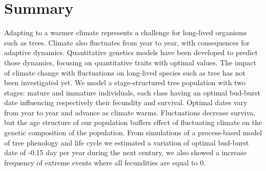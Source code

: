 \section*{Summary}

Adapting to a warmer climate represents a challenge for long-lived organisms such as trees. Climate also fluctuates from year to year, with consequences for adaptive dynamics. Quantitative genetics models have been developed to predict those dynamics, focusing on quantitative traits with optimal values. The impact of climate change with fluctuations on long-lived species such as tree has not been investigated yet.
We model a stage-structured tree population with two stages: mature and immature individuals, each class having an optimal bud-burst date influencing respectively their fecundity and survival. Optimal dates vary from year to year and advance as climate warms.
Fluctuations decrease surviva, but the age structure of our population buffers effect of fluctuating climate on the genetic composition of the population. From simulations of a process-based model of tree phenology and life cycle we estimated a variation of optimal bud-burst date of -0.15 day per year during the next century, we also showed a increase frequency of extreme events where all fecundities are equal to 0.
